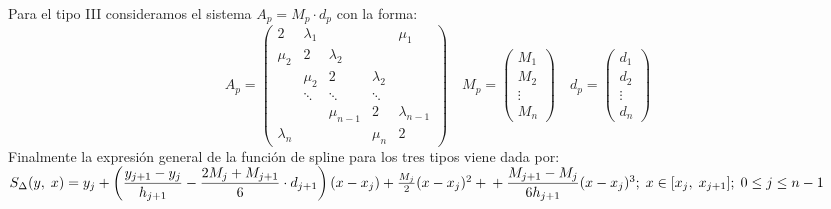 \documentclass[12pt,a4paper,oneside]{scrbook}
\newcounter{ns}
\begin{document}
Para el tipo III consideramos el sistema $A_p=M_p\cdot d_p$ con la forma:
\[
A_p=
\begin{pmatrix}
    2 & \lambda_1 &        &         & \mu_1\\
\mu_2 & 2      & \lambda_2 &         &\\
      & \mu_2  & 2         & \lambda_2  &\\
      & \ddots & \ddots    & \ddots & \\
      &        & \mu_{n-1} & 2      & \lambda_{n-1}\\
\lambda_n      &        &           & \mu_n  & 2
\end{pmatrix}\quad
M_p=
\begin{pmatrix}
    M_1\\
    M_2\\
    \vdots\\
    M_n
\end{pmatrix}\quad
d_p=
\begin{pmatrix}
    d_1\\
    d_2\\
    \vdots\\
    d_n
\end{pmatrix}
\]
Finalmente la expresión general de la función de spline para los tres tipos viene dada por:\\
$
S_\Delta (y,\; x)=y_j + \left( \dfrac{y_{j+1}-y_j}{h_{j+1}}-\dfrac{2M_j+M_{j+1}}{6}\cdot d_{j+1} \right)(x-x_j)+\frac{M_j}{2}(x-x_j)^2+\\ + \dfrac{M_{j+1}-M_j}{6h_{j+1}}(x-x_j)^3;\;x\in [x_j,\;x_{j+1}];\;0\leq j\leq n-1
$
\end{document}
